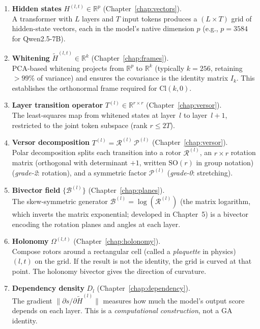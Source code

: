 \documentclass[11pt, twoside, openright]{memoir}
\newcommand{\rotor}[1]{\mathcal{R}^{(#1)}}  %
\newcommand{\bivec}[1]{\mathcal{B}^{(#1)}}  %
\newcommand{\metric}[1]{\mathcal{P}^{(#1)}} %
\begin{document}
\begin{enumerate}
\item \textbf{Hidden states} $H^{(l,t)} \in \mathbb{R}^p$
  (Chapter~\ref{chap:vectors}).  \\
  A transformer with $L$ layers and $T$ input tokens produces a
  $(L \times T)$ grid of hidden-state vectors, each in the model's
  native dimension $p$ (e.g., $p = 3584$ for Qwen2.5-7B).

\item \textbf{Whitening} $\widetilde{H}^{(l,t)} \in \mathbb{R}^k$
  (Chapter~\ref{chap:frames}).  \\
  PCA-based whitening projects from $\mathbb{R}^p$ to $\mathbb{R}^k$
  (typically $k = 256$, retaining $>99\%$ of variance) and ensures
  the covariance is the identity matrix $I_k$.
  This establishes the orthonormal frame required for $\mathrm{Cl}(k, 0)$.

\item \textbf{Layer transition operator} $T^{(l)} \in \mathbb{R}^{r \times r}$
  (Chapter~\ref{chap:versor}).  \\
  The least-squares map from whitened states at layer~$l$ to layer~$l+1$,
  restricted to the joint token subspace (rank $r \le 2T$).

\item \textbf{Versor decomposition} $T^{(l)} = \rotor{l}\,\metric{l}$
  (Chapter~\ref{chap:versor}).  \\
  Polar decomposition splits each transition into a rotor
  $\rotor{l}$, an $r \times r$ rotation matrix (orthogonal with determinant $+1$, written $\mathrm{SO}(r)$ in group notation) (\emph{grade-2}: rotation), and a
  symmetric factor $\metric{l}$ (\emph{grade-0}: stretching).

\item \textbf{Bivector field} $\{\bivec{l}\}$
  (Chapter~\ref{chap:planes}).  \\
  The skew-symmetric generator $\bivec{l} = \log(\rotor{l})$ (the matrix
  logarithm, which inverts the matrix exponential; developed in
  Chapter~5) is a bivector encoding the rotation planes and angles at
  each layer.

\item \textbf{Holonomy} $\Omega^{(l,t)}$
  (Chapter~\ref{chap:holonomy}).  \\
  Compose rotors around a rectangular cell (called a \emph{plaquette} in physics) $(l, t)$ on the grid.  If the
  result is not the identity, the grid is curved at that point.
  The holonomy bivector gives the direction of curvature.

\item \textbf{Dependency density} $D_l$
  (Chapter~\ref{chap:dependency}).  \\
  The gradient $\|\partial s / \partial \widetilde{H}^{(l)}\|$
  measures how much the model's output score depends on each layer.
  This is a \emph{computational construction}, not a GA identity.
\end{enumerate}
\end{document}
